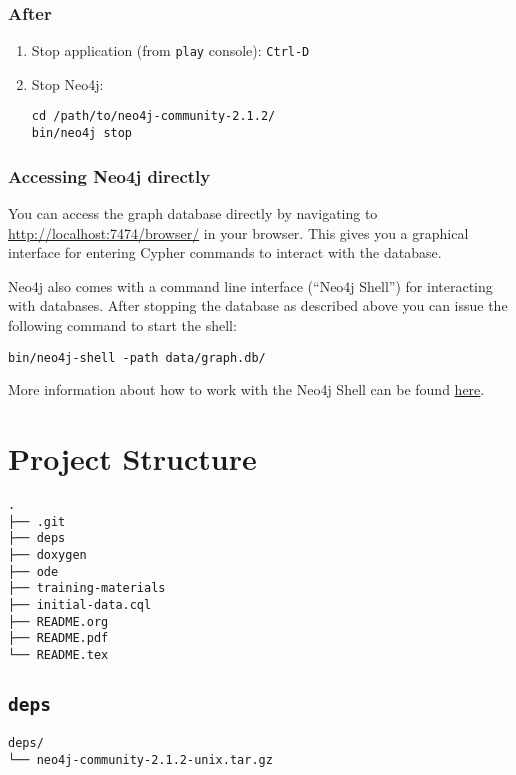 \documentclass[11pt]{article}
\begin{document}
\subsubsection{After}
\label{sec-2-3-2}
\begin{enumerate}
\item Stop application (from \texttt{play} console): \texttt{Ctrl-D}

\item Stop Neo4j:

\begin{verbatim}
cd /path/to/neo4j-community-2.1.2/
bin/neo4j stop
\end{verbatim}
\end{enumerate}

\subsubsection{Accessing Neo4j directly}
\label{sec-2-3-3}
You can access the graph database directly by navigating to
\url{http://localhost:7474/browser/} in your browser. This gives you a
graphical interface for entering Cypher commands to interact with
the database.

Neo4j also comes with a command line interface (``Neo4j Shell'') for
interacting with databases. After stopping the database as
described above you can issue the following command to start the
shell:

\begin{verbatim}
bin/neo4j-shell -path data/graph.db/
\end{verbatim}

More information about how to work with the Neo4j Shell can be
found \href{http://neo4j.com/docs/2.1.2/shell.html}{here}.

\section{Project Structure}
\label{sec-3}
\begin{verbatim}
.
├── .git
├── deps
├── doxygen
├── ode
├── training-materials
├── initial-data.cql
├── README.org
├── README.pdf
└── README.tex
\end{verbatim}

\subsection{\texttt{deps}}
\label{sec-3-1}
\begin{verbatim}
deps/
└── neo4j-community-2.1.2-unix.tar.gz
\end{verbatim}
\end{document}
